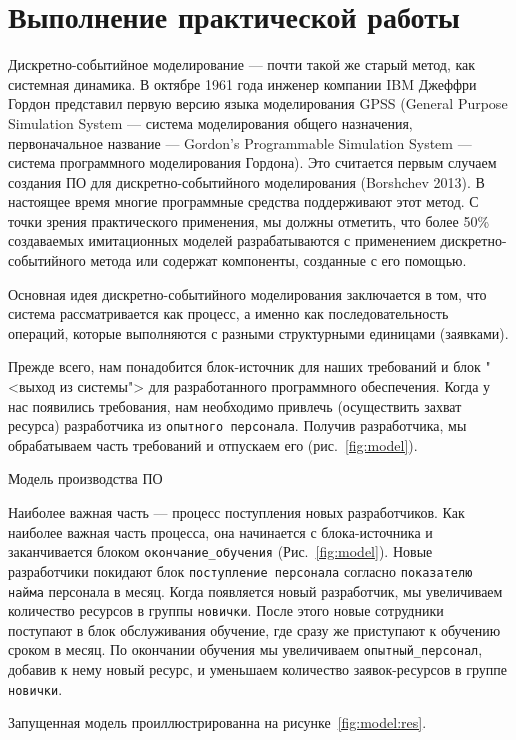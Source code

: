 \graphicspath{{./img}} %

\section*{Выполнение практической работы}
Дискретно-событийное моделирование --- почти такой же старый метод,
как системная динамика. В октябре 1961 года инженер компании IBM
Джеффри Гордон представил первую версию языка моделирования GPSS
(General Purpose Simulation System --- система моделирования общего
назначения, первоначальное название --- Gordon’s Programmable Simulation
System --- система программного моделирования Гордона). Это считается
первым случаем создания ПО для дискретно-событийного моделирования
(Borshchev 2013). В настоящее время многие программные средства
поддерживают этот метод. С точки зрения практического применения, мы
должны отметить, что более 50\% создаваемых имитационных моделей
разрабатываются с применением дискретно-событийного метода или
содержат компоненты, созданные с его помощью.\par
Основная идея дискретно-событийного моделирования заключается в том,
что система рассматривается как процесс, а именно как последовательность
операций, которые выполняются с разными структурными единицами
(заявками).\par
Прежде всего, нам
понадобится блок-источник для наших требований и блок "<выход из
системы"> для разработанного программного обеспечения. Когда у нас
появились требования, нам необходимо привлечь (осуществить захват
ресурса) разработчика из \texttt{опытного персонала}. Получив разработчика,
мы обрабатываем часть требований и отпускаем его (рис.~\ref{fig:model}).

\begin{image}
	\caption{Модель производства ПО}
	\label{fig:model}
\end{image}

Наиболее важная часть --- процесс поступления новых
разработчиков. Как наиболее важная часть процесса, она начинается с
блока-источника и заканчивается блоком \texttt{окончание\_обучения}
(Рис.~\ref{fig:model}).
Новые разработчики покидают блок \texttt{поступление персонала} согласно
\texttt{показателю найма} персонала в месяц. Когда появляется новый
разработчик, мы увеличиваем количество ресурсов в группы \texttt{новички}.
После этого новые сотрудники поступают в блок обслуживания обучение,
где сразу же приступают к обучению сроком в месяц. По окончании обучения
мы увеличиваем \texttt{опытный\_персонал}, добавив к нему новый ресурс, и
уменьшаем количество заявок-ресурсов в группе \texttt{новички}.\par
Запущенная модель проиллюстрированна на рисунке~\ref{fig:model:res}.

